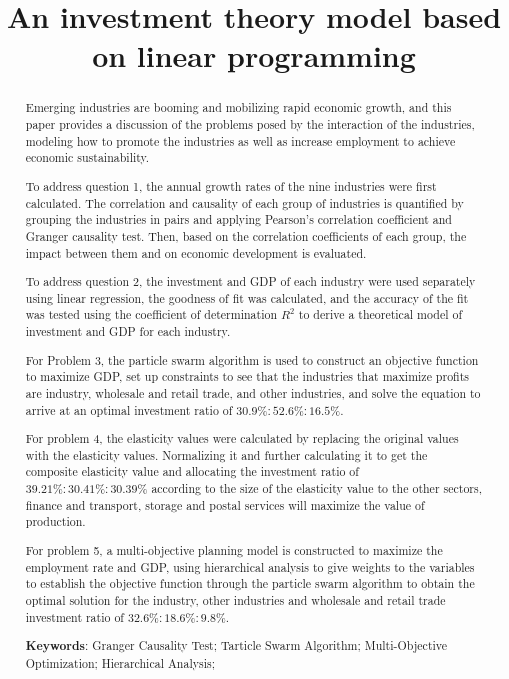\documentclass[12pt]{article}  %
\title{An investment theory model based on linear programming}  %
\begin{document}
\begin{abstract}
\setlength{\parindent}{2em}
	
	Emerging industries are booming and mobilizing rapid economic growth, and this paper provides a discussion of the problems posed by the interaction of the industries, modeling how to promote the industries as well as increase employment to achieve economic sustainability.

	To address question 1, the annual growth rates of the nine industries were first calculated. The correlation and causality of each group of industries is quantified by grouping the industries in pairs and applying Pearson's correlation coefficient and Granger causality test. Then, based on the correlation coefficients of each group, the impact between them and on economic development is evaluated.

	To address question 2, the investment and GDP of each industry were used separately using linear regression, the goodness of fit was calculated, and the accuracy of the fit was tested using the coefficient of determination ${R^2}$ to derive a theoretical model of investment and GDP for each industry.

	For Problem 3, the particle swarm algorithm is used to construct an objective function to maximize GDP, set up constraints to see that the industries that maximize profits are industry, wholesale and retail trade, and other industries, and solve the equation to arrive at an optimal investment ratio of $30.9\%:52.6\%:16.5\%$.

	For problem 4, the elasticity values were calculated by replacing the original values with the elasticity values. Normalizing it and further calculating it to get the composite elasticity value and allocating the investment ratio of $39.21\%:30.41\%:30.39\%$ according to the size of the elasticity value to the other sectors, finance and transport, storage and postal services will maximize the value of production.

	For problem 5, a multi-objective planning model is constructed to maximize the employment rate and GDP, using hierarchical analysis to give weights to the variables to establish the objective function through the particle swarm algorithm to obtain the optimal solution for the industry, other industries and wholesale and retail trade investment ratio of $32.6\%:18.6\%:9.8\%$.

	
	
	
	
	
	\vspace{5pt}
	\textbf{Keywords}: Granger Causality Test; Tarticle Swarm Algorithm; Multi-Objective Optimization; Hierarchical Analysis;
	
\end{abstract}
\end{document}
